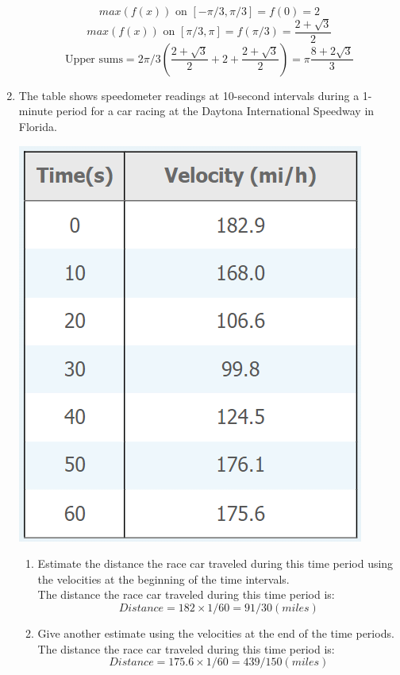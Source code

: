 \documentclass[12pt]{article}
\begin{document}
\begin{enumerate}
        \[max(f(x))\text{ on }[-\pi/3, \pi/3] = f(0) = 2\]
        \[max(f(x))\text{ on }[\pi/3, \pi] = f(\pi/3) = \frac{2 + \sqrt{3}}{2}\] 
        \[\text{Upper sums} = 2\pi/3 (\frac{2 + \sqrt{3}}{2} + 2 + \frac{2 + \sqrt{3}}{2}) = \pi\frac{8+2\sqrt{3}}{3} \]
        \setcounter{enumi}{9}
        \item The table shows speedometer readings at 10-second intervals during a 1-minute period for a car racing at the Daytona International Speedway in Florida.
        \begin{center}
            \includegraphics[scale=0.4]{img/img-0.png}
        \end{center}
        \begin{enumerate}
            \item Estimate the distance the race car traveled during this time period using the velocities at the beginning of the time intervals.\\
                The distance the race car traveled during this time period is:
                \[Distance = 182 \times 1/60 = 91/30 (miles)\]
            \item Give another estimate using the velocities at the end of the time periods.\\
                The distance the race car traveled during this time period is:
                \[Distance = 175.6 \times 1/60 = 439/150 (miles)\]

\end{enumerate}
\end{enumerate}
\end{document}
